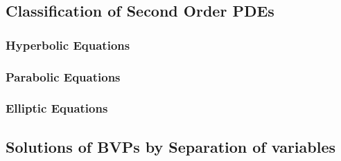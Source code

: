 \documentclass{article}
\theoremstyle{plain}
\theoremstyle{definition}
\numberwithin{equation}{section}
\begin{document}
\subsection{Classification of Second Order PDEs}

\subsubsection{Hyperbolic Equations}

\subsubsection{Parabolic Equations}

\subsubsection{Elliptic Equations}

\subsection{Solutions of BVPs by Separation of variables}
\end{document}
